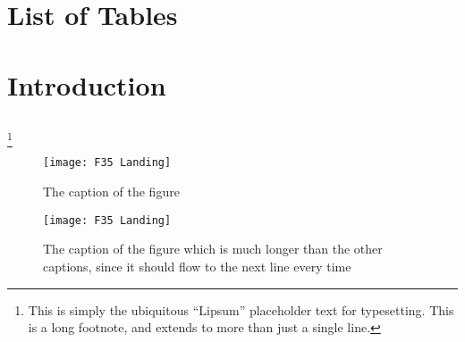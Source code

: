 \documentclass[12pt, oneside]{report}
\begin{document}
\frontmatter

\maketitle
\makesignatures
\makecopyright

\unpacklipsum[1-3]
\makeabstract{\lipsumexp}


\tableofcontents

\clearpage
{}
\chapter*{List of Tables}

\clearpage
{}
\listoffigures





\mainmatter %

\chapter{Introduction}
\lipsum[1]
\section{\lipsum[150][1-3]}
\lipsum[3]
\footnote{This is simply the ubiquitous ``Lipsum'' placeholder text for typesetting. This is a long footnote, and extends to more than just a single line.}

\begin{figure}[h]
  \centering
  \texttt{[image: F35 Landing]}
  \caption{The caption of the figure}
  \label{fig:BlockDiagram1}
\end{figure}
  
\begin{figure}[h]
  \centering
  \texttt{[image: F35 Landing]}
  \caption{The caption of the figure which is much longer than the other captions, since it should flow to the next line every time}
  \label{fig:BlockDiagram2}
\end{figure}
\end{document}
